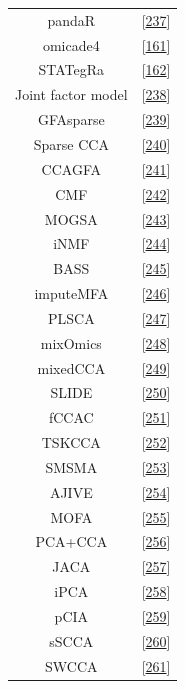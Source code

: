 \documentclass[
  a4paper,
]{book}
\begin{document}
\begin{longtable}[]{@{}cc@{}}
pandaR & {[}\protect\hyperlink{ref-schlauch2017}{237}{]} \\
omicade4 & {[}\protect\hyperlink{ref-meng2014}{161}{]} \\
STATegRa & {[}\protect\hyperlink{ref-planell2021}{162}{]} \\
Joint factor model & {[}\protect\hyperlink{ref-ray2014}{238}{]} \\
GFAsparse & {[}\protect\hyperlink{ref-bunte2016}{239}{]} \\
Sparse CCA & {[}\protect\hyperlink{ref-chen2013}{240}{]} \\
CCAGFA & {[}\protect\hyperlink{ref-leppuxe4aho2017}{241}{]} \\
CMF & {[}\protect\hyperlink{ref-klami2014}{242}{]} \\
MOGSA & {[}\protect\hyperlink{ref-meng2018}{243}{]} \\
iNMF & {[}\protect\hyperlink{ref-yang2016b}{244}{]} \\
BASS & {[}\protect\hyperlink{ref-zhao2015}{245}{]} \\
imputeMFA & {[}\protect\hyperlink{ref-voillet2016}{246}{]} \\
PLSCA & {[}\protect\hyperlink{ref-beaton2016}{247}{]} \\
mixOmics & {[}\protect\hyperlink{ref-singh2019}{248}{]} \\
mixedCCA & {[}\protect\hyperlink{ref-yoon2019}{249}{]} \\
SLIDE & {[}\protect\hyperlink{ref-gaynanova2017}{250}{]} \\
fCCAC & {[}\protect\hyperlink{ref-madrigal2017}{251}{]} \\
TSKCCA & {[}\protect\hyperlink{ref-yoshida2017}{252}{]} \\
SMSMA & {[}\protect\hyperlink{ref-kawaguchi2017}{253}{]} \\
AJIVE & {[}\protect\hyperlink{ref-feng2018}{254}{]} \\
MOFA & {[}\protect\hyperlink{ref-argelaguet2020}{255}{]} \\
PCA+CCA & {[}\protect\hyperlink{ref-brown2018}{256}{]} \\
JACA & {[}\protect\hyperlink{ref-zhang2020}{257}{]} \\
iPCA & {[}\protect\hyperlink{ref-tang2021}{258}{]} \\
pCIA & {[}\protect\hyperlink{ref-min2019}{259}{]} \\
sSCCA & {[}\protect\hyperlink{ref-safo2018}{260}{]} \\
SWCCA & {[}\protect\hyperlink{ref-min2017}{261}{]} \\

\end{longtable}
\end{document}
